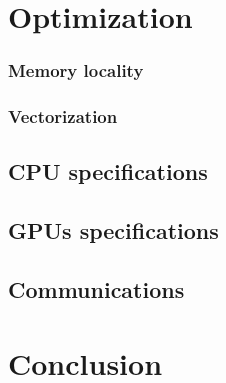 \section{Optimization}


\subsubsection{Memory locality}

\subsubsection{Vectorization}

\subsection{CPU specifications}

\subsection{GPUs specifications}

\subsection{Communications}


\section{Conclusion}
